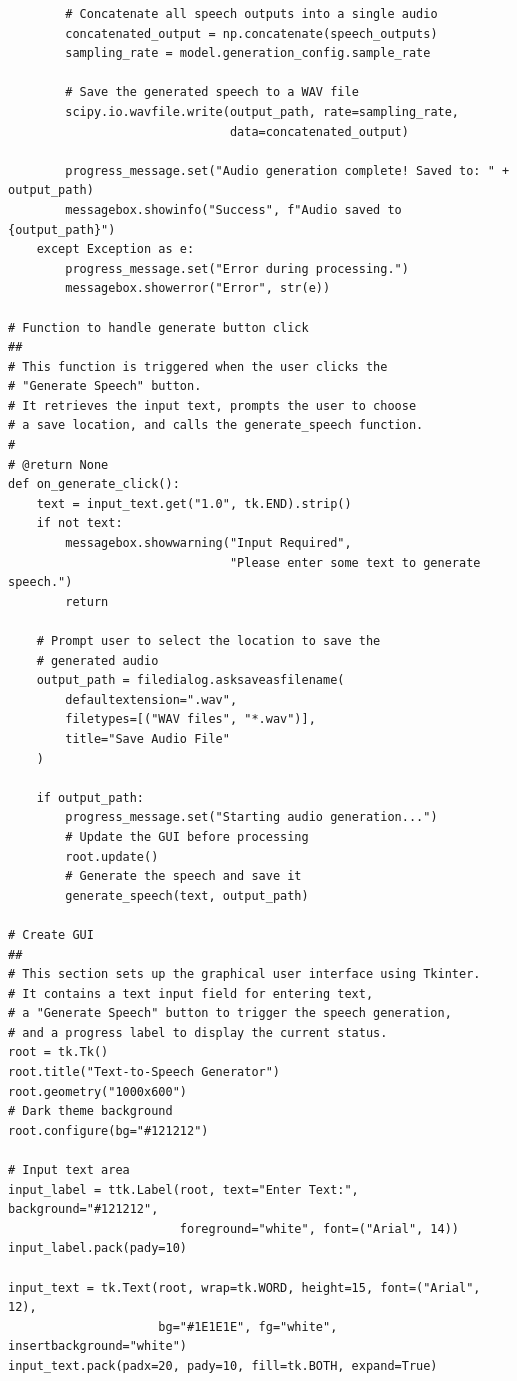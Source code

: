 \documentclass[12pt, a4paper]{article}
\begin{document}
\begin{verbatim}
        # Concatenate all speech outputs into a single audio
        concatenated_output = np.concatenate(speech_outputs)
        sampling_rate = model.generation_config.sample_rate

        # Save the generated speech to a WAV file
        scipy.io.wavfile.write(output_path, rate=sampling_rate, 
                               data=concatenated_output)

        progress_message.set("Audio generation complete! Saved to: " + output_path)
        messagebox.showinfo("Success", f"Audio saved to {output_path}")
    except Exception as e:
        progress_message.set("Error during processing.")
        messagebox.showerror("Error", str(e))

# Function to handle generate button click
##
# This function is triggered when the user clicks the 
# "Generate Speech" button.
# It retrieves the input text, prompts the user to choose 
# a save location, and calls the generate_speech function.
#
# @return None
def on_generate_click():
    text = input_text.get("1.0", tk.END).strip()
    if not text:
        messagebox.showwarning("Input Required", 
                               "Please enter some text to generate speech.")
        return

    # Prompt user to select the location to save the 
    # generated audio
    output_path = filedialog.asksaveasfilename(
        defaultextension=".wav",
        filetypes=[("WAV files", "*.wav")],
        title="Save Audio File"
    )

    if output_path:
        progress_message.set("Starting audio generation...")
        # Update the GUI before processing
        root.update()  
        # Generate the speech and save it
        generate_speech(text, output_path)  

# Create GUI
##
# This section sets up the graphical user interface using Tkinter. 
# It contains a text input field for entering text,
# a "Generate Speech" button to trigger the speech generation, 
# and a progress label to display the current status.
root = tk.Tk()
root.title("Text-to-Speech Generator")
root.geometry("1000x600") 
# Dark theme background
root.configure(bg="#121212")  

# Input text area
input_label = ttk.Label(root, text="Enter Text:", background="#121212", 
                        foreground="white", font=("Arial", 14))
input_label.pack(pady=10)

input_text = tk.Text(root, wrap=tk.WORD, height=15, font=("Arial", 12), 
                     bg="#1E1E1E", fg="white", insertbackground="white")
input_text.pack(padx=20, pady=10, fill=tk.BOTH, expand=True)


\end{verbatim}
\end{document}
